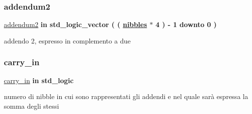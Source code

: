 \subsubsection{\texorpdfstring{addendum2}{addendum2}}
{\footnotesize\ttfamily \hyperlink{group___carry_loockahead_ga2715463c615cf8418f85c6a1427ce62c}{addendum2} {\bfseries \textcolor{vhdlchar}{in}\textcolor{vhdlchar}{ }} {\bfseries \textcolor{vhdlchar}{std\+\_\+logic\+\_\+vector}\textcolor{vhdlchar}{ }\textcolor{vhdlchar}{(}\textcolor{vhdlchar}{ }\textcolor{vhdlchar}{(}\textcolor{vhdlchar}{ }\textcolor{vhdlchar}{ }\textcolor{vhdlchar}{ }\textcolor{vhdlchar}{ }{\bfseries \hyperlink{group___carry_loockahead_ga0b63b586531492d0fa882246cca071c1}{nibbles}} \textcolor{vhdlchar}{$\ast$}\textcolor{vhdlchar}{ } \textcolor{vhdldigit}{4} \textcolor{vhdlchar}{ }\textcolor{vhdlchar}{)}\textcolor{vhdlchar}{ }\textcolor{vhdlchar}{-\/}\textcolor{vhdlchar}{ } \textcolor{vhdldigit}{1} \textcolor{vhdlchar}{ }\textcolor{vhdlchar}{downto}\textcolor{vhdlchar}{ }\textcolor{vhdlchar}{ } \textcolor{vhdldigit}{0} \textcolor{vhdlchar}{ }\textcolor{vhdlchar}{)}\textcolor{vhdlchar}{ }} \hspace{0.3cm}{\ttfamily [Port]}}



addendo 2, espresso in complemento a due 

\mbox{\label{group___carry_loockahead_ga1c211cdf2d4cf97e869c442832c53439}} 
\subsubsection{\texorpdfstring{carry\+\_\+in}{carry\_in}}
{\footnotesize\ttfamily \hyperlink{group___carry_loockahead_ga1c211cdf2d4cf97e869c442832c53439}{carry\+\_\+in} {\bfseries \textcolor{vhdlchar}{in}\textcolor{vhdlchar}{ }} {\bfseries \textcolor{vhdlchar}{std\+\_\+logic}\textcolor{vhdlchar}{ }} \hspace{0.3cm}{\ttfamily [Port]}}

numero di nibble in cui sono rappresentati gli addendi e nel quale sarà espressa la somma degli stessi \mbox{\label{group___carry_loockahead_ga851aaea297bdc862fba5478c4bf0e214}} 
